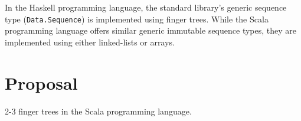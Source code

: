 \documentclass[a4paper,nobib]{tufte-handout}
\begin{document}
In the Haskell programming language, the standard library's generic sequence type (\Verb|Data.Sequence|) is implemented using finger trees.\cite{data_sequence} While the Scala programming language offers similar generic immutable sequence types, they are implemented using either linked-lists or arrays.\cite{scala_lib}

\section{Proposal}

 2-3 finger trees in the Scala programming language.



\end{document}
